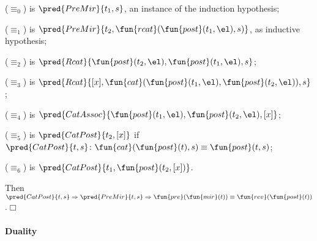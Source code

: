 \begin{itemize*}

  \item (\(\equiv_0\)) is \(\pred{PreMir}{t_1,s}\), an instance of the
  induction hypothesis;

  \item (\(\equiv_1\)) is
  \(\pred{PreMir}{t_2,\fun{rcat}(\fun{post}(t_1,\el),s)}\), as
  inductive hypothesis; 

  \item (\(\equiv_2\)) is
    \(\pred{Rcat}{\fun{post}(t_2,\el),\fun{post}(t_1,\el),s}\);

  \item (\(\equiv_3\)) is
    \(\pred{Rcat}{[x],\fun{cat}(\fun{post}(t_1,\el),
      \fun{post}(t_2,\el)),s}\);

  \item (\(\equiv_4\)) is \(\pred{CatAssoc}{\fun{post}(t_1,\el),
    \fun{post}(t_2,\el),[x]}\);

  \item (\(\equiv_5\)) is
  \(\pred{CatPost}{t_2,[x]}\) if
  \(\pred{CatPost}{t,s} \colon \fun{cat}(\fun{post}(t),s) \equiv
  \fun{post}(t,s)\);

  \item (\(\equiv_6\)) is \(\pred{CatPost}{t_1,\fun{post}(t_2,[x])}\).

\end{itemize*}
Then  \(\pred{CatPost}{t,s} \Rightarrow
\pred{PreMir}{t,s} \Rightarrow \fun{pre}(\fun{mir}(t)) \equiv
\fun{rev}(\fun{post}(t))\).\hfill\(\Box\)

\paragraph{Duality}
\label{thm:duality}

